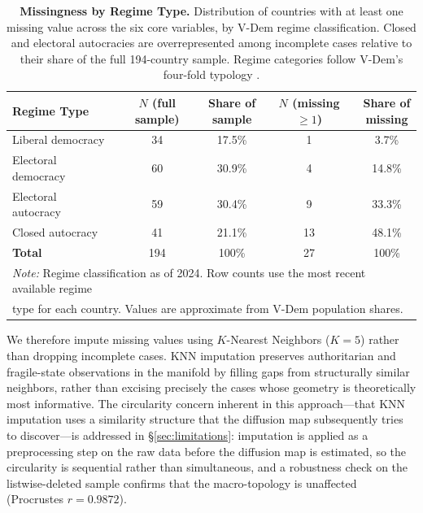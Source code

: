 \documentclass[12pt]{article}
\begin{document}
\begin{table}[htbp]
    \centering
    \caption{\textbf{Missingness by Regime Type.} Distribution of countries with at least one missing value across the six core variables, by V-Dem regime classification. Closed and electoral autocracies are overrepresented among incomplete cases relative to their share of the full 194-country sample. Regime categories follow V-Dem's four-fold typology \cite{coppedge2025vdem}.}
    \label{tab:missingness}
    \begin{tabular}{lcccc}
        \toprule
        Regime Type         & $N$ (full sample) & \makecell{Share of                                                                       \\sample} & $N$ (missing $\geq 1$) & \makecell{Share of\\missing}              \\
        \midrule
        Liberal democracy   & 34                & 17.5\%             & 1  & 3.7\%                                                          \\
        Electoral democracy & 60                & 30.9\%             & 4  & 14.8\%                                                         \\
        Electoral autocracy & 59                & 30.4\%             & 9  & 33.3\%                                                         \\
        Closed autocracy    & 41                & 21.1\%             & 13 & 48.1\%                                                         \\
        \midrule
        \textbf{Total}      & 194               & 100\%              & 27 & 100\%                                                          \\
        \bottomrule
        \multicolumn{5}{l}{\footnotesize \textit{Note:} Regime classification as of 2024. Row counts use the most recent available regime} \\
        \multicolumn{5}{l}{\footnotesize type for each country. Values are approximate from V-Dem population shares.}                      \\
    \end{tabular}
\end{table}

We therefore impute missing values using $K$-Nearest Neighbors ($K=5$) rather than dropping incomplete cases. KNN imputation preserves authoritarian and fragile-state observations in the manifold by filling gaps from structurally similar neighbors, rather than excising precisely the cases whose geometry is theoretically most informative. The circularity concern inherent in this approach---that KNN imputation uses a similarity structure that the diffusion map subsequently tries to discover---is addressed in §\ref{sec:limitations}: imputation is applied as a preprocessing step on the raw data before the diffusion map is estimated, so the circularity is sequential rather than simultaneous, and a robustness check on the listwise-deleted sample confirms that the macro-topology is unaffected (Procrustes $r = 0.9872$).
\end{document}
